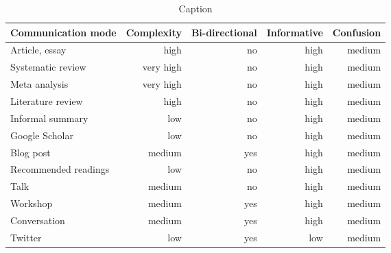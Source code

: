 \begin{table*}\centering
{}
\begin{tabular}{@{}lrrrr@{}}\toprule
Communication mode & Complexity & Bi-directional & Informative  & Confusion
\\\midrule
Article, essay      & high      & no    & high & medium  \\
Systematic review   & very high & no    & high & medium\\
Meta analysis       & very high & no    & high & medium\\
Literature review   & high      & no    & high & medium\\
Informal summary    & low       & no    & high & medium\\
Google Scholar      & low       & no    & high & medium\\
Blog post           & medium    & yes   & high & medium\\
Recommended readings& low       & no    & high & medium\\
Talk                & medium    & no    & high & medium\\
Workshop            & medium    & yes   & high & medium\\
Conversation        & medium    & yes   & high & medium\\
Twitter             & low       & yes   & low & medium\\
\bottomrule
\end{tabular}
\caption{Caption}
\end{table*}